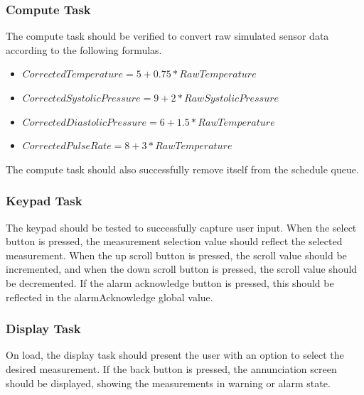\documentclass[12pt]{article} %
\begin{document}
    \subsubsection{Compute Task}
    The compute task should be verified to convert raw simulated sensor data
    according to the following formulas.
    \begin{itemize}
      \item $CorrectedTemperature = 5 + 0.75 * RawTemperature$
      \item $CorrectedSystolicPressure = 9 + 2 * RawSystolicPressure$
      \item $CorrectedDiastolicPressure = 6 + 1.5 * RawTemperature$
      \item $CorrectedPulseRate = 8 + 3 * RawTemperature$
    \end{itemize}

    The compute task should also successfully remove itself from the schedule
    queue.

    \subsubsection{Keypad Task} 
    The keypad should be tested to successfully
    capture user input.  When the select button is pressed, the measurement
    selection value should reflect the selected measurement.  When the up
    scroll button is pressed, the scroll value should be incremented, and when
    the down scroll button is pressed, the scroll value should be decremented.  
    If the alarm acknowledge button is pressed, this should be reflected in 
    the alarmAcknowledge global value.

    \subsubsection{Display Task}
    On load, the display task should present the user with an option to select
    the desired measurement.  If the back button is pressed, the annunciation
    screen should be displayed, showing the measurements in warning or alarm
    state.  
\end{document}
